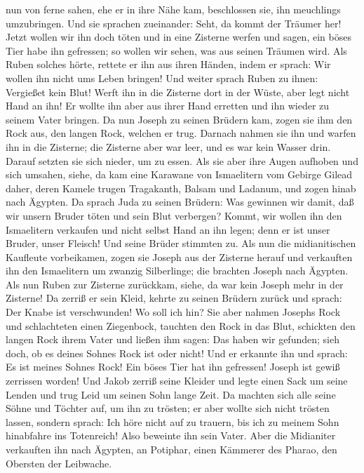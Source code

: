 nun von ferne sahen, ehe er in ihre Nähe kam, beschlossen sie, ihn
meuchlings umzubringen.  Und sie sprachen zueinander:
Seht, da kommt der Träumer her!  Jetzt wollen wir ihn
doch töten und in eine Zisterne werfen und sagen, ein böses Tier habe
ihn gefressen; so wollen wir sehen, was aus seinen Träumen wird.
 Als Ruben solches hörte, rettete er ihn aus ihren
Händen, indem er sprach: Wir wollen ihn nicht ums Leben bringen!
 Und weiter sprach Ruben zu ihnen: Vergießet kein Blut!
Werft ihn in die Zisterne dort in der Wüste, aber legt nicht Hand an
ihn! Er wollte ihn aber aus ihrer Hand erretten und ihn wieder zu seinem
Vater bringen.  Da nun Joseph zu seinen Brüdern kam,
zogen sie ihm den Rock aus, den langen Rock, welchen er trug.
 Darnach nahmen sie ihn und warfen ihn in die Zisterne;
die Zisterne aber war leer, und es war kein Wasser drin. 
Darauf setzten sie sich nieder, um zu essen. Als sie aber ihre Augen
aufhoben und sich umsahen, siehe, da kam eine Karawane von Ismaelitern
vom Gebirge Gilead daher, deren Kamele trugen Tragakanth, Balsam und
Ladanum, und zogen hinab nach Ägypten.  Da sprach Juda zu
seinen Brüdern: Was gewinnen wir damit, daß wir unsern Bruder töten und
sein Blut verbergen?  Kommt, wir wollen ihn den
Ismaelitern verkaufen und nicht selbst Hand an ihn legen; denn er ist
unser Bruder, unser Fleisch! Und seine Brüder stimmten zu.
 Als nun die midianitischen Kaufleute vorbeikamen, zogen
sie Joseph aus der Zisterne herauf und verkauften ihn den Ismaelitern um
zwanzig Silberlinge; die brachten Joseph nach Ägypten. 
Als nun Ruben zur Zisterne zurückkam, siehe, da war kein Joseph mehr in
der Zisterne! Da zerriß er sein Kleid,  kehrte zu seinen
Brüdern zurück und sprach: Der Knabe ist verschwunden! Wo soll ich hin?
 Sie aber nahmen Josephs Rock und schlachteten einen
Ziegenbock, tauchten den Rock in das Blut,  schickten den
langen Rock ihrem Vater und ließen ihm sagen: Das haben wir gefunden;
sieh doch, ob es deines Sohnes Rock ist oder nicht!  Und
er erkannte ihn und sprach: Es ist meines Sohnes Rock! Ein böses Tier
hat ihn gefressen! Joseph ist gewiß zerrissen worden! 
Und Jakob zerriß seine Kleider und legte einen Sack um seine Lenden und
trug Leid um seinen Sohn lange Zeit.  Da machten sich
alle seine Söhne und Töchter auf, um ihn zu trösten; er aber wollte sich
nicht trösten lassen, sondern sprach: Ich höre nicht auf zu trauern, bis
ich zu meinem Sohn hinabfahre ins Totenreich! Also beweinte ihn sein
Vater.  Aber die Midianiter verkauften ihn nach Ägypten,
an Potiphar, einen Kämmerer des Pharao, den Obersten der Leibwache.

